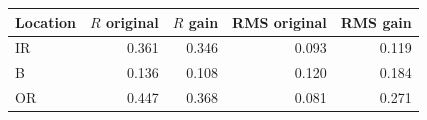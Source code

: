 \begin{tabular}{@{}lrrrr@{}}
\toprule
Location & $R$ original & $R$ gain & RMS original & RMS gain \\
\midrule
IR & 0.361 & 0.346 & 0.093 & 0.119 \\
B & 0.136 & 0.108 & 0.120 & 0.184 \\
OR & 0.447 & 0.368 & 0.081 & 0.271 \\
\bottomrule
\end{tabular}
